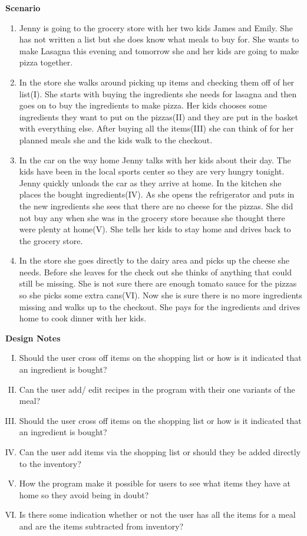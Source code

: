 \textbf{Scenario}
\begin{enumerate}
\item Jenny is going to the grocery store with her two kids James and Emily. She has not written a list but she does know what meals to buy for. She wants to make Lasagna this evening and tomorrow she and her kids are going to make pizza together. 
\item In the store she walks around picking up items and checking them off of her list(I). She starts with buying the ingredients she needs for lasagna and then goes on to buy the ingredients to make pizza. Her kids chooses some ingredients they want to put on the pizzas(II) and they are put in the basket with everything else. After buying all the items(III) she can think of for her planned meals she and the kids walk to the checkout. 
\item In the car on the way home Jenny talks with her kids about their day. The kids have been in the local sports center so they are very hungry tonight. Jenny quickly unloads the car as they arrive at home. In the kitchen she places the bought ingredients(IV). As she opens the refrigerator and puts in the new ingredients she sees that there are no cheese for the pizzas. She did not buy any when she was in the grocery store because she thought there were plenty at home(V). She tells her kids to stay home and drives back to the grocery store.
\item In the store she goes directly to the dairy area and picks up the cheese she needs. Before she leaves for the check out she thinks of anything that could still be missing. She is not sure there are enough tomato sauce for the pizzas so she picks some extra cans(VI). Now she is sure there is no more ingredients missing and walks up to the checkout. She pays for the ingredients and drives home to cook dinner with her kids.  
\end{enumerate}

\textbf{Design Notes}

\begin{enumerate} [(I)]
\item Should the user cross off items on the shopping list or how is it indicated that an ingredient is bought?  
\item Can the user add/ edit recipes in the program with their one variants of the meal?
\item Should the user cross off items on the shopping list or how is it indicated that an ingredient is bought? 
\item Can the user add items via the shopping list or should they be added directly to the inventory?
\item How the program make it possible for users to see what items they have at home so they avoid being in doubt?
\item Is there some indication whether or not the user has all the items for a meal and are the items subtracted from inventory?
\end{enumerate}

